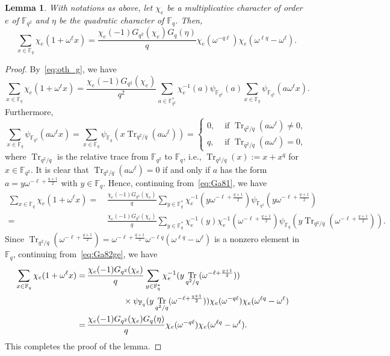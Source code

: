 \documentclass[10pt]{amsart}
\newtheorem{lemm}[theo]{Lemma}
\theoremstyle{definition}
\DeclareMathOperator{\Tr}{Tr}
\newcommand*\F{{\mathbb F}}
\begin{document}
\begin{lemm}\label{lem:charac_ge}
With notations as above, let $\chi_e$ be a multiplicative character of order $e$ of $\F_{q^2}$ and $\eta$ be the quadratic character of $\F_{q}$. Then,
\[
\sum_{x\in \F_q}\chi_e(1+\omega^\ell x)=\frac{\chi_e(-1)G_{q^2}(\chi_e)G_q(\eta)}{q}\chi_e(\omega^{-q\ell})\chi_e(\omega^{\ell q}-\omega^{\ell}).
\]
\end{lemm}
\begin{proof}
By~\eqref{eq:oth_g}, we have
\begin{equation}\label{eq:Ga81}
\sum_{x\in \F_q}\chi_e(1+\omega^\ell x)=
\frac{\chi_e(-1)G_{q^2}(\chi_e)}{q^2}\sum_{a\in \F_{q^2}^\ast}\chi_e^{-1}(a)\psi_{\F_{q^2}}(a)\sum_{x\in \F_q}\psi_{\F_{q^2}}(a \omega^\ell x).
\end{equation}
Furthermore,
\[
\sum_{x\in \F_q}\psi_{\F_{q^2}}(a \omega^\ell x)=
\sum_{x\in \F_q}\psi_{\F_q}(x\Tr_{q^2/q}(a \omega^\ell))=
\begin{cases}
0,& \text{ if } \Tr_{q^2/q}(a\omega^\ell)\not=0,\\
q,& \text{ if } \Tr_{q^2/q}(a\omega^\ell)=0,
\end{cases}
\]
where $\Tr_{q^2/q}$ is the relative trace from $\F_{q^2}$ to $\F_q$, i.e., $\Tr_{q^2/q}(x):=x+x^q$ for $x\in \F_{q^2}$. It is clear that $\Tr_{q^2/q}(a\omega^\ell)=0$ if and only if $a$ has the form $a=y\omega^{-\ell+\frac{q+1}{2}}$ with $y\in \F_q$. Hence, continuing from~\eqref{eq:Ga81}, we have
\begin{align}
\sum_{x\in \F_q}\chi_e(1+\omega^\ell x)=&\,
\frac{\chi_e(-1)G_{q^2}(\chi_e)}{q}\sum_{y\in \F_q^\ast}\chi_e^{-1}(y\omega^{-\ell+\frac{q+1}{2}})\psi_{\F_{q^2}}(y\omega^{-\ell+\frac{q+1}{2}})\nonumber\\
=&\, \frac{\chi_e(-1)G_{q^2}(\chi_e)}{q}\sum_{y\in \F_q^\ast}\chi_e^{-1}(y)\chi_e^{-1}(\omega^{-\ell+\frac{q+1}{2}})\psi_{\F_{q}}(y\Tr_{q^2/q}(\omega^{-\ell+\frac{q+1}{2}})). \label{eq:Ga82ge}
\end{align}
Since $\Tr_{q^2/q}(\omega^{-\ell+\frac{q+1}{2}})=\omega^{-\ell+\frac{q+1}{2}}\omega^{-\ell q}(\omega^{\ell q}-\omega^{\ell})$ is a nonzero element in $\F_q$, continuing from~\eqref{eq:Ga82ge}, we have
\begin{align*}
\sum_{x\in \F_q}\chi_e(1+\omega^\ell x)=&\,
\frac{\chi_e(-1)G_{q^2}(\chi_e)}{q}\sum_{y\in \F_q^\ast}\chi_e^{-1}(y\Tr_{q^2/q}(\omega^{-\ell+\frac{q+1}{2}}))\\
&\mkern 80mu\times\psi_{\F_q}(y\Tr_{q^2/q}(\omega^{-\ell+\frac{q+1}{2}}))\chi_e(\omega^{-q\ell})
\chi_e(\omega^{\ell q}-\omega^\ell)\phantom{\frac.\int}\\
=&\,
\frac{\chi_e(-1)G_{q^2}(\chi_e)G_q(\eta)}{q}\chi_e(\omega^{-q\ell})
\chi_e(\omega^{\ell q}-\omega^\ell).
\end{align*}
This completes the proof of the lemma.
\end{proof}
\end{document}
